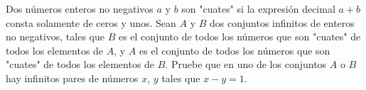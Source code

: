  Dos números enteros no negativos $a$ y $b$ son "cuates" si la expresión decimal $a+b$ consta solamente de ceros y unos. Sean $A$ y $B$ dos conjuntos infinitos de enteros no negativos, tales que $B$ es el conjunto de todos los números que son "cuates" de todos los elementos de $A$, y $A$ es el conjunto de todos los números que son "cuates" de todos los elementos de $B$. Pruebe que en uno de los conjuntos $A$ o $B$ hay infinitos pares de números $x$, $y$ tales que $x-y =1$. 